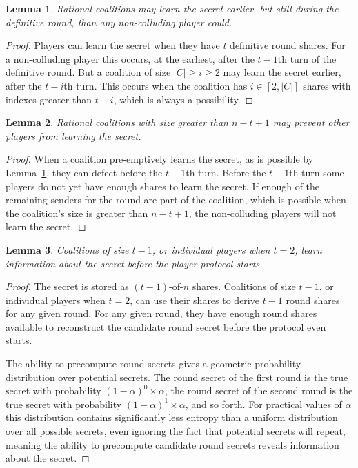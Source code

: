 \documentclass[12pt]{dalcsthesis}
\newtheorem{lemma}{Lemma}
\begin{document}
\begin{lemma}\label{Lem:ABIP:Preempt}Rational coalitions may learn the secret earlier, but still during the definitive round, than any non-colluding player could.\end{lemma}
\begin{proof}
Players can learn the secret when they have $t$ definitive round shares. For a non-colluding player this occurs, at the earliest, after the $t-1$th turn of the definitive round. But a coalition of size $|C| \geq i \geq 2$ may learn the secret earlier, after the $t-i$th turn. This occurs when the coalition has $i \in [2, |C|]$ shares with indexes greater than $t-i$, which is always a possibility.
\end{proof}

\begin{lemma}\label{Lem:ABIP:RatColsCanPrevents}Rational coalitions with size greater than $n-t+1$ may prevent other players from learning the secret.\end{lemma}
\begin{proof}
When a coalition pre-emptively learns the secret, as is possible by Lemma~\ref{Lem:ABIP:Preempt}, they can defect before the $t-1$th turn. Before the $t-1$th turn some players do not yet have enough shares to learn the secret. If enough of the remaining senders for the round are part of the coalition, which is possible when the coalition's size is greater than $n-t+1$, the non-colluding players will not learn the secret.
\end{proof}

\begin{lemma}Coalitions of size $t-1$, or individual players when $t=2$, learn information about the secret before the player protocol starts.\end{lemma}
\begin{proof}
The secret is stored as $(t-1)$-of-$n$ shares. Coalitions of size $t-1$, or individual players when $t=2$, can use their shares to derive $t-1$ round shares for any given round. For any given round, they have enough round shares available to reconstruct the candidate round secret before the protocol even starts.

The ability to precompute round secrets gives a geometric probability distribution over potential secrets. The round secret of the first round is the true secret with probability $(1-\alpha)^0 \times \alpha$, the round secret of the second round is the true secret with probability $(1-\alpha)^1 \times \alpha$, and so forth. For practical values of $\alpha$ this distribution contains significantly less entropy than a uniform distribution over all possible secrets, even ignoring the fact that potential secrets will repeat, meaning the ability to precompute candidate round secrets reveals information about the secret.
\end{proof}
\end{document}
